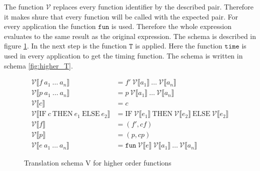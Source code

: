 The function $\mathcal{V}$ replaces every function identifier by the described pair.
Therefore it makes shure that every function will be called with the expected pair.
For every application the function $\texttt{fun}$ is used.
Therefore the whole expression evaluates to the same result as the original expression.
The schema is described in figure \ref{fig:higher_V}.
In the next step is the function $\texttt{T}$ is applied.
Here the function $\texttt{time}$ is used in every application to get the timing function.
The schema is written in schema \ref{fig:higher_T}.
\begin{figure}
  \begin{align*}
    \mathcal{V}\llbracket f\ a_{1}\ \dots\ a_{n}\rrbracket &= f'\ \mathcal{V}\llbracket a_{1}\rrbracket\ \dots \ \mathcal{V}\llbracket a_{n}\rrbracket\\
    \mathcal{V}\llbracket p\ a_{1}\ \dots\ a_{n}\rrbracket &= p\ \mathcal{V}\llbracket a_{1}\rrbracket\ \dots \ \mathcal{V}\llbracket a_{n}\rrbracket\\
    \mathcal{V}\llbracket c \rrbracket &= c\\
    \mathcal{V}\llbracket \text{IF}\ c\ \text{THEN}\ e_{1}\ \text{ELSE}\ e_{2}\rrbracket &= \text{IF}\  \mathcal{V}\llbracket e_{1}\rrbracket\ \text{THEN}\ \mathcal{V}\llbracket e_{2}\rrbracket\ \text{ELSE}\ \mathcal{V}\llbracket e_{2}\rrbracket\\
    \mathcal{V}\llbracket f\rrbracket &= (f',cf)\\
    \mathcal{V}\llbracket p\rrbracket &= (p,cp)\\
    \mathcal{V}\llbracket e\ a_{1}\ \dots\ a_{n}\rrbracket &= \texttt{fun}\ \mathcal{V}\llbracket e\rrbracket\ \mathcal{V}\llbracket a_{1} \rrbracket\ \dots\ \mathcal{V}\llbracket a_{n}\rrbracket
  \end{align*}
  \caption{Translation schema V for higher order functions}
  \label{fig:higher_V}
\end{figure}
